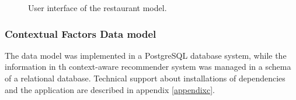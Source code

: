 \begin{figure}
\captionsetup{justification=centering,margin=2cm,font=footnotesize}
\centering
\setlength\fboxsep{0pt}
\setlength\fboxrule{0.7pt}
\caption{User interface of the restaurant model.}
\label{fig:restaurantmodel}       
\end{figure}

\subsubsection{Contextual Factors Data model} \label{datamodelsection}   

The data model was implemented in a PostgreSQL database system, 
while the information in th context-aware recommender system was
managed in a schema of a relational database. Technical support 
about installations of dependencies and the application are 
described in appendix \ref{appendixc}.

